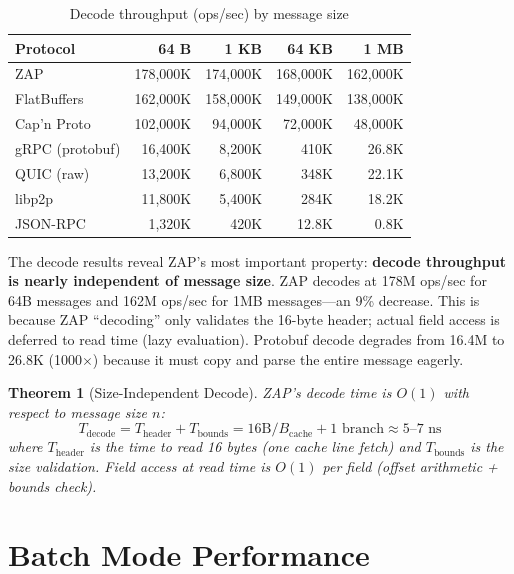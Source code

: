 \documentclass[11pt,letterpaper]{article}
\newtheorem{theorem}{Theorem}
\begin{document}
\begin{table}[h]
\centering
\caption{Decode throughput (ops/sec) by message size}
\label{tab:decode-sizes}
\begin{tabular}{lrrrr}
\toprule
\textbf{Protocol} & \textbf{64 B} & \textbf{1 KB} & \textbf{64 KB} & \textbf{1 MB} \\
\midrule
\rowcolor{luxblue!10}
ZAP & 178,000K & 174,000K & 168,000K & 162,000K \\
FlatBuffers & 162,000K & 158,000K & 149,000K & 138,000K \\
Cap'n Proto & 102,000K & 94,000K & 72,000K & 48,000K \\
gRPC (protobuf) & 16,400K & 8,200K & 410K & 26.8K \\
QUIC (raw) & 13,200K & 6,800K & 348K & 22.1K \\
libp2p & 11,800K & 5,400K & 284K & 18.2K \\
JSON-RPC & 1,320K & 420K & 12.8K & 0.8K \\
\bottomrule
\end{tabular}
\end{table}

The decode results reveal ZAP's most important property: \textbf{decode throughput is nearly independent of message size}. ZAP decodes at 178M ops/sec for 64B messages and 162M ops/sec for 1MB messages---an 9\% decrease. This is because ZAP ``decoding'' only validates the 16-byte header; actual field access is deferred to read time (lazy evaluation). Protobuf decode degrades from 16.4M to 26.8K (1000$\times$) because it must copy and parse the entire message eagerly.

\begin{theorem}[Size-Independent Decode]
ZAP's decode time is $O(1)$ with respect to message size $n$:
\[
T_{\text{decode}} = T_{\text{header}} + T_{\text{bounds}} = 16\text{B}/B_{\text{cache}} + 1\text{ branch} \approx 5\text{--}7\text{ ns}
\]
where $T_{\text{header}}$ is the time to read 16 bytes (one cache line fetch) and $T_{\text{bounds}}$ is the size validation. Field access at read time is $O(1)$ per field (offset arithmetic + bounds check).
\end{theorem}

\section{Batch Mode Performance}
\end{document}
